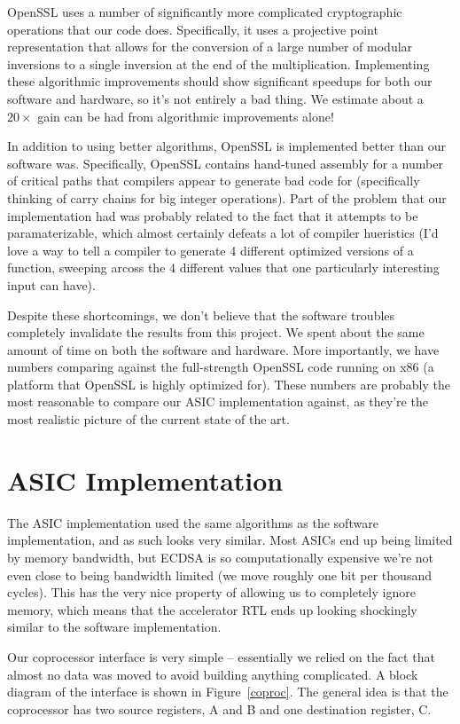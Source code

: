 \documentclass[twocolumn]{article}
\begin{document}
OpenSSL uses a number of significantly more complicated cryptographic
operations that our code does.  Specifically, it uses a projective
point representation that allows for the conversion of a large number
of modular inversions to a single inversion at the end of the
multiplication.  Implementing these algorithmic improvements should
show significant speedups for both our software and hardware, so it's
not entirely a bad thing.  We estimate about a $20\times$ gain can be
had from algorithmic improvements alone!

In addition to using better algorithms, OpenSSL is implemented better
than our software was.  Specifically, OpenSSL contains hand-tuned
assembly for a number of critical paths that compilers appear to
generate bad code for (specifically thinking of carry chains for
big integer operations).  Part of the problem that our implementation
had was probably related to the fact that it attempts to be
paramaterizable, which almost certainly defeats a lot of compiler
hueristics (I'd love a way to tell a compiler to generate 4 different
optimized versions of a function, sweeping arcoss the 4 different
values that one particularly interesting input can have).

Despite these shortcomings, we don't believe that the software troubles
completely invalidate the results from this project.  We spent about
the same amount of time on both the software and hardware. 
More importantly, we have numbers comparing
against the full-strength OpenSSL code running on x86 (a platform that
OpenSSL is highly optimized for\cite{kasper-openssl_ecc}).  These
numbers are probably the most reasonable to compare our ASIC
implementation against, as they're the most realistic picture of the
current state of the art.

\section{ASIC Implementation}

The ASIC implementation used the same algorithms as the software
implementation, and as such looks very similar.  Most ASICs end up
being limited by memory bandwidth, but ECDSA is so computationally
expensive we're not even close to being bandwidth limited (we move
roughly one bit per thousand cycles).  This has the very nice property
of allowing us to completely ignore memory, which means that the
accelerator RTL ends up looking shockingly similar to the software
implementation.

Our coprocessor interface is very simple -- essentially we relied on
the fact that almost no data was moved to avoid building anything
complicated.  A block diagram of the interface is shown in
Figure~\ref{coproc}.  The general idea is that the coprocessor has two
source registers, A and B and one destination register, C.
\end{document}
